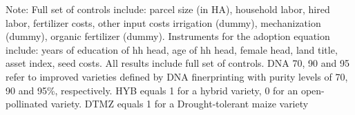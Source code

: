 \begin{table}[H]
{\begin{threeparttable}
\begin{tablenotes}
\footnotesize
\item{Note: Full set of controls include: parcel size (in HA), household labor, hired labor, fertilizer costs, other input costs irrigation (dummy), mechanization (dummy), organic fertilizer (dummy). Instruments for the adoption equation include: years of education of hh head, age of hh head, female head, land title, asset index, seed costs. All results include full set of controls. DNA 70, 90 and 95 refer to improved varieties defined by DNA finerprinting with purity levels of 70, 90 and 95\%, respectively. HYB equals 1 for a hybrid variety, 0 for an open-pollinated variety. DTMZ equals 1 for a Drought-tolerant maize variety}
\end{tablenotes}
\end{threeparttable}
}
\end{table}
